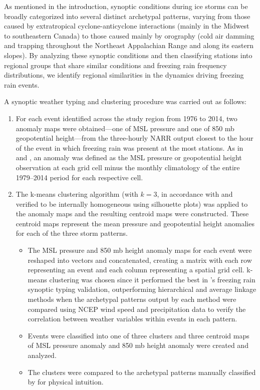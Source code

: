 \documentclass[twocol]{ametsoc}
\begin{document}
As mentioned in the introduction, synoptic conditions during ice storms can be broadly categorized into several distinct archetypal patterns, varying from those caused by extratropical cyclone-anticyclone interactions (mainly in the Midwest to southeastern Canada) to those caused mainly by orography (cold air damming and trapping throughout the Northeast Appalachian Range and along its eastern slopes). By analyzing these synoptic conditions and then classifying stations into regional groups that share similar conditions and freezing rain frequency distributions, we identify regional similarities in the dynamics driving freezing rain events.

A synoptic weather typing and clustering procedure was carried out as follows:

\begin{enumerate}
\item
For each event identified across the study region from 1976 to 2014, two anomaly maps were obtained---one of MSL pressure and one of 850 mb geopotential height---from the three-hourly NARR output closest to the hour of the event in which freezing rain was present at the most stations. As in \citet{erfani2012automated} and \citet{gyakumandroebber2001}, an anomaly was defined as the MSL pressure or geopotential height observation at each grid cell minus the monthly climatology of the entire 1979--2014 period for each respective cell.
\item
The k-means clustering algorithm (with $k=3$, in accordance with \citet{erfani2012automated} and verified to be internally homogeneous using silhouette plots) was applied to the anomaly maps and the resulting centroid maps were constructed. These centroid maps represent the mean pressure and geopotential height anomalies for each of the three storm patterns. 
\begin{itemize}
\item
The MSL pressure and 850 mb height anomaly maps for each event were reshaped into vectors and concatenated, creating a matrix with each row representing an event and each column representing a spatial grid cell. k-means clustering was chosen since it performed the best in \citet{erfani2012automated}'s freezing rain synoptic typing validation, outperforming hierarchical and average linkage methods when the archetypal patterns output by each method were compared using NCEP wind speed and precipitation data to verify the correlation between weather variables within events in each pattern.
\item
Events were classified into one of three clusters and three centroid maps of MSL pressure anomaly and 850 mb height anomaly were created and analyzed.
\item
The clusters were compared to the archetypal patterns manually classified by \citet{rauber2001synoptic} for physical intuition.
\end{itemize}
\end{enumerate}
\end{document}
